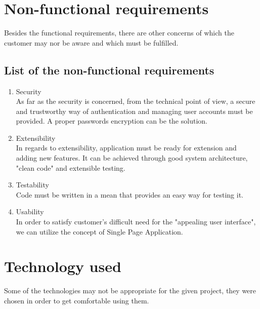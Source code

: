 \documentclass[]{article}
\begin{document}
\section{Non-functional requirements}
\hspace{0.9cm}
Besides the functional requirements, there are other concerns of which the customer may nor be aware and which must be fulfilled.


\subsection{List of the non-functional requirements}
\begin{enumerate}
	\item Security\\
	As far as the security is concerned, from the technical point of view, a secure and trustworthy way of authentication and managing user accounts must be provided.
	A proper passwords encryption can be the solution.
	
	\item Extensibility\\
	In regards to extensibility, application must be ready for extension and adding new features. It can be achieved through good system architecture, "clean code" and extensible testing.
	
	\item Testability\\
	Code must be written in a mean that provides an easy way for testing it.
	
	\item Usability\\
	In order to satisfy customer's difficult need for the "appealing user interface", we can utilize the concept of Single Page Application.
	
	
\end{enumerate}

\section{Technology used}
\hspace{0.9cm}
Some of the technologies may not be appropriate for the given project, they were chosen in order to get comfortable using them.
\end{document}
